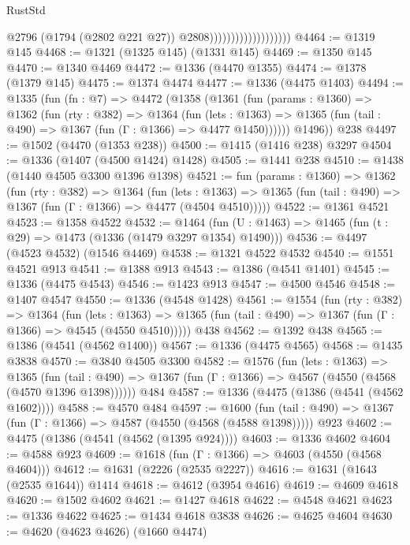 \begin{lexlean}{RustStd}
\begin{coremodule}
                                          @2796
                                          (@1794 (@2802 @221 @27))
                                          @2808)))))))))))))))))))
@4464 := @1319 @145
@4468 := @1321 (@1325 @145) (@1331 @145)
@4469 := @1350 @145
@4470 := @1340 @4469
@4472 := @1336 (@4470 @1355)
@4474 := @1378 (@1379 @145)
@4475 := @1374 @4474
@4477 := @1336 (@4475 @1403)
@4494 := @1335
    (fun (fn : @7) =>
    @4472
      (@1358
        (@1361
          (fun (params : @1360) =>
          @1362
            (fun (rty : @382) =>
            @1364
              (fun (lets : @1363) =>
              @1365 (fun (tail : @490) => @1367 (fun (Γ : @1366) => @4477 @1450))))))
        @1496))
    @238
@4497 := @1502 (@4470 (@1353 @238))
@4500 := @1415 (@1416 @238) @3297
@4504 := @1336 (@1407 (@4500 @1424) @1428)
@4505 := @1441 @238
@4510 := @1438 (@1440 @4505 @3300 @1396 @1398)
@4521 := fun (params : @1360) =>
  @1362
    (fun (rty : @382) =>
    @1364
      (fun (lets : @1363) =>
      @1365 (fun (tail : @490) => @1367 (fun (Γ : @1366) => @4477 (@4504 @4510)))))
@4522 := @1361 @4521
@4523 := @1358 @4522
@4532 := @1464 (fun (U : @1463) => @1465 (fun (t : @29) => @1473 (@1336 (@1479 @3297 @1354) @1490)))
@4536 := @4497 (@4523 @4532) (@1546 @4469)
@4538 := @1321 @4522 @4532
@4540 := @1551 @4521 @913
@4541 := @1388 @913
@4543 := @1386 (@4541 @1401)
@4545 := @1336 (@4475 @4543)
@4546 := @1423 @913
@4547 := @4500 @4546
@4548 := @1407 @4547
@4550 := @1336 (@4548 @1428)
@4561 := @1554
    (fun (rty : @382) =>
    @1364
      (fun (lets : @1363) =>
      @1365 (fun (tail : @490) => @1367 (fun (Γ : @1366) => @4545 (@4550 @4510)))))
    @438
@4562 := @1392 @438
@4565 := @1386 (@4541 (@4562 @1400))
@4567 := @1336 (@4475 @4565)
@4568 := @1435 @3838
@4570 := @3840 @4505 @3300
@4582 := @1576
    (fun (lets : @1363) =>
    @1365
      (fun (tail : @490) => @1367 (fun (Γ : @1366) => @4567 (@4550 (@4568 (@4570 @1396 @1398))))))
    @484
@4587 := @1336 (@4475 (@1386 (@4541 (@4562 @1602))))
@4588 := @4570 @484
@4597 := @1600
    (fun (tail : @490) => @1367 (fun (Γ : @1366) => @4587 (@4550 (@4568 (@4588 @1398)))))
    @923
@4602 := @4475 (@1386 (@4541 (@4562 (@1395 @924))))
@4603 := @1336 @4602
@4604 := @4588 @923
@4609 := @1618 (fun (Γ : @1366) => @4603 (@4550 (@4568 @4604)))
@4612 := @1631 (@2226 (@2535 @2227))
@4616 := @1631 (@1643 (@2535 @1644)) @1414
@4618 := @4612 (@3954 @4616)
@4619 := @4609 @4618
@4620 := @1502 @4602
@4621 := @1427 @4618
@4622 := @4548 @4621
@4623 := @1336 @4622
@4625 := @1434 @4618 @3838
@4626 := @4625 @4604
@4630 := @4620 (@4623 @4626) (@1660 @4474)

\end{coremodule}
\end{lexlean}
